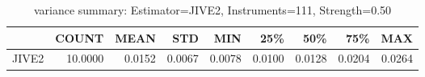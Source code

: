 \begin{table}[ht]
\centering
\caption{variance summary: Estimator=JIVE2, Instruments=111, Strength=0.50}
\begin{tabular}{lrrrrrrrr}
\toprule
 & COUNT & MEAN & STD & MIN & 25\% & 50\% & 75\% & MAX \\
\midrule
JIVE2 & 10.0000 & 0.0152 & 0.0067 & 0.0078 & 0.0100 & 0.0128 & 0.0204 & 0.0264 \\
\bottomrule
\end{tabular}
\end{table}
